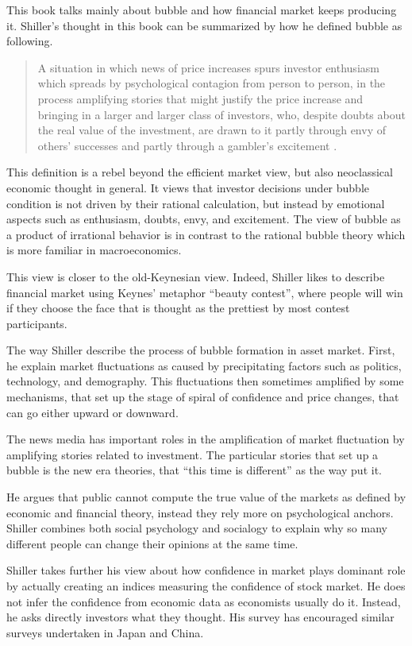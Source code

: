 \documentclass[a4paper, 12pt]{article}
\begin{document}
This book talks mainly about bubble and how financial market keeps producing it. Shiller's thought in this book can be summarized by how he defined bubble as following.
\begin{quote}
	A situation in which news of price increases spurs investor enthusiasm which spreads by psychological contagion from person to person, in the process amplifying stories that might  justify the price increase and bringing in a larger and larger class of investors, who, despite  doubts about the real value of the investment, are drawn to it partly through envy of others’  successes and partly through a gambler’s excitement \citet{shiller2005irrational}.
\end{quote}

This definition is a rebel beyond the efficient market view, but also neoclassical economic thought in general. It views that investor decisions under bubble condition is not driven by their rational calculation, but instead by emotional aspects such as enthusiasm, doubts, envy, and excitement. The view of bubble as a product of irrational behavior is in contrast to the rational bubble theory which is more familiar in macroeconomics. 

This view is closer to the old-Keynesian view. Indeed, Shiller likes to describe financial market using Keynes' metaphor ``beauty contest'', where people will  win if they choose the face that is thought as the prettiest by most contest participants. 

The way Shiller describe the process of bubble formation in asset market. First, he explain market fluctuations as caused by precipitating factors such as politics, technology, and demography. This fluctuations then sometimes amplified by some mechanisms, that set up the stage of spiral of confidence and price changes, that can go either upward or downward.

The news media has important roles in the amplification of market fluctuation by amplifying stories related to investment. The particular stories that set up a bubble is the new era theories, that ``this time is different'' as the way \citet{reinhart2009this} put it.

He argues that public cannot compute the true value of the markets as defined by economic and financial theory, instead they rely more on psychological anchors. Shiller combines both social psychology and socialogy to explain why so many different people can change their opinions at the same time. 

Shiller takes further his view about how confidence in market plays dominant role by actually creating an indices measuring the confidence of stock market. He does not infer the confidence from economic data as economists usually do it. Instead, he asks directly investors what they thought. His survey has encouraged similar surveys undertaken in Japan and China.
\end{document}

